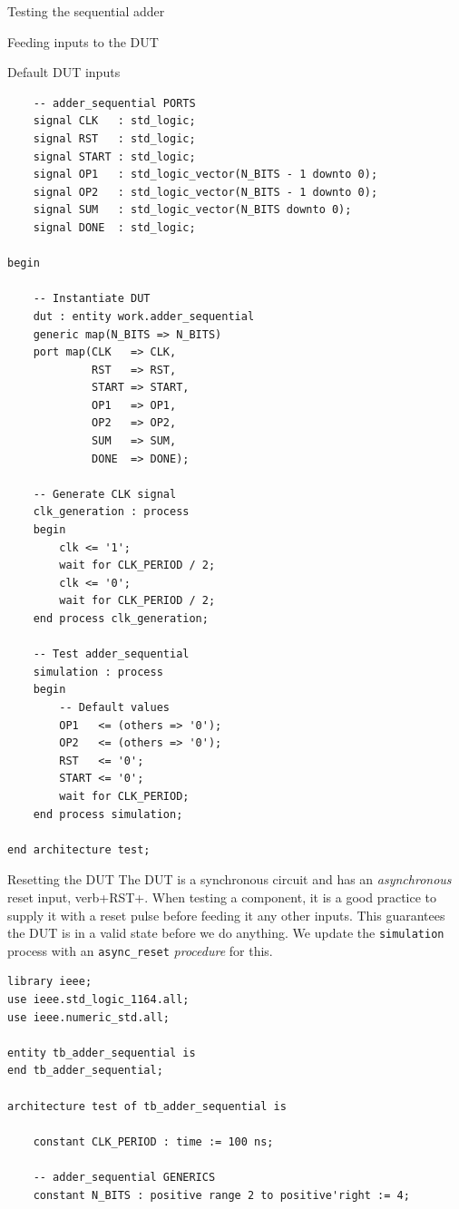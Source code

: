 \documentclass[lab]{course}
\begin{document}
\begin{section}{Testing the sequential adder}
\begin{subsection}{Feeding inputs to the DUT}
\begin{subsubsection}{Default DUT inputs}
\begin{lstlisting}
    -- adder_sequential PORTS
    signal CLK   : std_logic;
    signal RST   : std_logic;
    signal START : std_logic;
    signal OP1   : std_logic_vector(N_BITS - 1 downto 0);
    signal OP2   : std_logic_vector(N_BITS - 1 downto 0);
    signal SUM   : std_logic_vector(N_BITS downto 0);
    signal DONE  : std_logic;

begin

    -- Instantiate DUT
    dut : entity work.adder_sequential
    generic map(N_BITS => N_BITS)
    port map(CLK   => CLK,
             RST   => RST,
             START => START,
             OP1   => OP1,
             OP2   => OP2,
             SUM   => SUM,
             DONE  => DONE);

    -- Generate CLK signal
    clk_generation : process
    begin
        clk <= '1';
        wait for CLK_PERIOD / 2;
        clk <= '0';
        wait for CLK_PERIOD / 2;
    end process clk_generation;

    -- Test adder_sequential
    simulation : process
    begin
        -- Default values
        OP1   <= (others => '0');
        OP2   <= (others => '0');
        RST   <= '0';
        START <= '0';
        wait for CLK_PERIOD;
    end process simulation;

end architecture test;
            \end{lstlisting}
        \end{subsubsection}

        \begin{subsubsection}{Resetting the DUT}
            The DUT is a synchronous circuit and has an \emph{asynchronous} reset input, verb+RST+. When testing a component, it is a good practice to supply it with a reset pulse before feeding it any other inputs. This guarantees the DUT is in a valid state before we do anything. We update the \verb+simulation+ process with an \verb+async_reset+ \emph{procedure} for this.

            \begin{lstlisting}[caption={Add \emph{asynchronous} reset}, captionpos=b, label={lst:sequential_process_simulation_async_reset}]
library ieee;
use ieee.std_logic_1164.all;
use ieee.numeric_std.all;

entity tb_adder_sequential is
end tb_adder_sequential;

architecture test of tb_adder_sequential is

    constant CLK_PERIOD : time := 100 ns;

    -- adder_sequential GENERICS
    constant N_BITS : positive range 2 to positive'right := 4;


\end{lstlisting}
\end{subsubsection}
\end{subsection}
\end{section}
\end{document}
